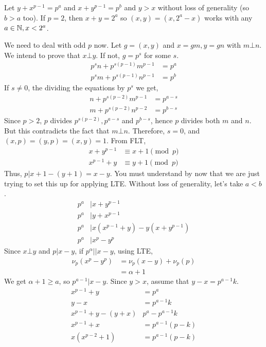 \documentclass[problems.tex]{subfile}
\begin{document}
	\begin{solution}
		Let $y+x^{p-1}=p^a$ and $x+y^{p-1}=p^b$ and $y>x$ without loss of generality (so $b>a$ too). If $p=2$, then $x+y=2^a$ so $(x,y)=(x,2^a-x)$ works with any $a\in\mathbb{N},x<2^a$.
		
		We need to deal with odd $p$ now. Let $g=(x,y)$ and $x=gm,y=gn$ with $m\bot n$. We intend to prove that $x\bot y$. If not, $g=p^s$ for some $s$.
			\begin{align*}
				p^sn+p^{s(p-1)}m^{p-1} & = p^a\\
				p^sm+p^{s(p-1)}n^{p-1} & = p^b
			\end{align*}
		If $s\neq0$, the dividing the equations by $p^s$ we get,
			\begin{align*}
				n+p^{s(p-2)}m^{p-1} & = p^{a-s}\\
				m+p^{s(p-2)}n^{p-2} & = p^{b-s}
			\end{align*}
		Since $p>2$, $p$ divides $p^{s(p-2)},p^{a-s}$ and $p^{b-s}$, hence $p$ divides both $m$ and $n$. But this contradicts the fact that $m\bot n$. Therefore, $s=0$, and $(x,p)=(y,p)=(x,y)=1$. From FLT,
			\begin{align*}
				x+y^{p-1}&\equiv x+1\pmod p\\
				x^{p-1}+y&\equiv y+1\pmod p
			\end{align*}
		Thus, $p|x+1-(y+1)=x-y$. You must understand by now that we are just trying to set this up for applying LTE. Without loss of generality, let's take $a<b$.
			\begin{align*}
				p^a& |x+y^{p-1}\\
				p^a& |y+x^{p-1}\\
				p^a& |x(x^{p-1}+y)-y(x+y^{p-1})\\
				p^a& |x^p-y^p
			\end{align*}
		Since $x\bot y$ and $p|x-y$, if $p^\alpha ||x-y$, using LTE,
			\begin{align*}
				\nu_p(x^p-y^p)  & = \nu_p(x-y)+\nu_p(p)\\
								& = \alpha +1
			\end{align*}
		We get $\alpha +1\geq a$, so $p^{a-1}|x-y$. Since $y>x$, assume that $y-x=p^{a-1}k$.
			\begin{align*}
				x^{p-1}+y & = p^a\\
				y-x & = p^{a-1}k\\
				x^{p-1}+y-(y+x) & p^a-p^{a-1}k\\
				x^{p-1}+x & = p^{a-1}(p-k)\\
				x(x^{p-2}+1) & = p^{a-1}(p-k)
			\end{align*}

\end{solution}
\end{document}
